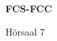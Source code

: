 \documentclass[a4paper]{article}
\begin{document}
\printGenericVSLHeader
\begin{center}
\begin{vsltext}{3cm}{4cm}

   \vspace{0.5cm} 

   \textbf{FCS-FCC}

    \vspace{1.5cm}

    Hörsaal 7

\end{vsltext}

\end{center}
\end{document}
